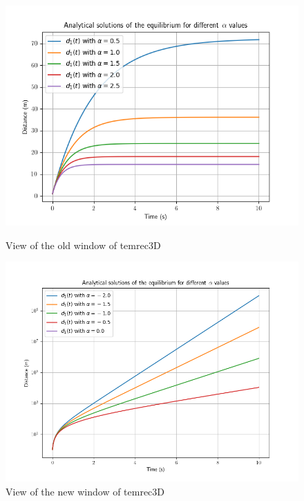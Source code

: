 \documentclass{article}
\begin{document}
		\begin{figure}[H]
			\centering
			\begin{minipage}[t]{0.50\linewidth}
				\centering
				\includegraphics[width=1.4\linewidth]{Stability.png}
				\caption{View of the old window of temrec3D}
				\label{fig:OV}
			\end{minipage}
			\hfill
			\begin{minipage}[t]{0.50\linewidth}
				\centering
				\includegraphics[width=1.4\linewidth]{Unstability.png}
				\caption{View of the new window of temrec3D}
				\label{fig:NV}
			\end{minipage}
		\end{figure}
		
\end{document}
